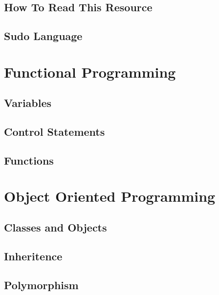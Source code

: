 \documentclass[10pt,a4paper,titlepage]{book}
\begin{document}
\section{How To Read This Resource}

\vfill
\pagebreak
\section{Sudo Language}

\vfill
\pagebreak
\chapter{Functional Programming}

\vfill
\pagebreak
\section{Variables}

\vfill
\pagebreak
\section{Control Statements}

\vfill
\pagebreak
\section{Functions}

\vfill
\pagebreak
\chapter{Object Oriented Programming}

\vfill
\pagebreak
\section{Classes and Objects}

\vfill
\pagebreak
\section{Inheritence}

\vfill
\pagebreak
\section{Polymorphism}

\vfill
\pagebreak
\end{document}
